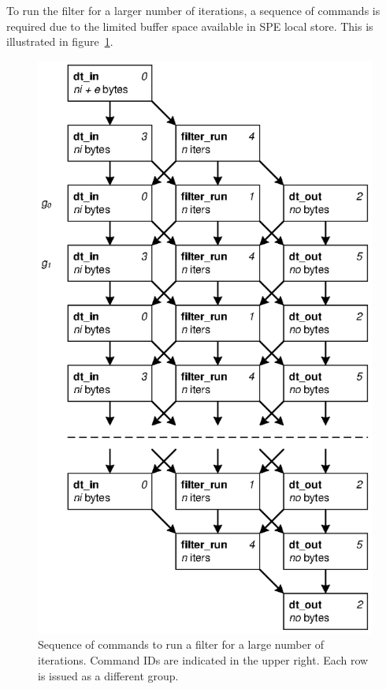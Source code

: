 To run the filter for a larger number of iterations, a sequence of commands is required due to the limited buffer space available in SPE local store. This is illustrated in figure~\ref{fig:lib:ext}.

\begin{figure}[!htb]
\begin{center}
\includegraphics{figs/ext}
\end{center}
\caption[Sequence of commands to run a filter for a large number of iterations.]{Sequence of commands to run a filter for a large number of iterations. Command IDs are indicated in the upper right. Each row is issued as a different group.}
\label{fig:lib:ext}
\end{figure}

